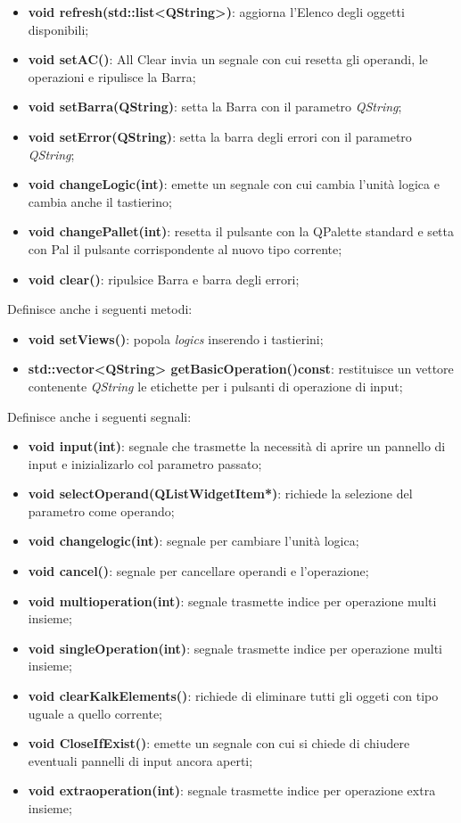 \documentclass[a4paper,10pt]{article}
\begin{document}
        \begin{itemize}
            \item \textbf{void refresh(std::list<QString>)}: aggiorna l'Elenco degli oggetti disponibili;
            \item \textbf{void setAC()}: All Clear invia un segnale con cui resetta gli operandi, le operazioni e ripulisce la Barra;
            \item \textbf{void setBarra(QString)}: setta la Barra con il parametro \textit{QString};
            \item \textbf{void setError(QString)}: setta la barra degli errori con il parametro \textit{QString};
            \item \textbf{void changeLogic(int)}: emette un segnale con cui cambia l'unità logica e cambia anche il tastierino;
            \item \textbf{void changePallet(int)}: resetta il pulsante con la QPalette standard e setta con Pal il pulsante corrispondente al nuovo tipo corrente;
            \item \textbf{void clear()}: ripulsice Barra e barra degli errori;
        \end{itemize}
        Definisce anche i seguenti metodi:
        \begin{itemize}
            \item \textbf{void setViews()}: popola \textit{logics} inserendo i tastierini;
            \item \textbf{std::vector<QString> getBasicOperation()const}: restituisce un vettore contenente \textit{QString} le etichette per i pulsanti di operazione di input;
        \end{itemize}
        Definisce anche i seguenti segnali:
        \begin{itemize}
            \item \textbf{void input(int)}: segnale che trasmette la necessità di aprire un pannello di input e inizializarlo col parametro passato;
            \item \textbf{void selectOperand(QListWidgetItem*)}: richiede la selezione del parametro come operando;
            \item \textbf{void changelogic(int)}: segnale per cambiare l'unità logica;
            \item \textbf{void cancel()}: segnale per cancellare operandi e l'operazione;
            \item \textbf{void multioperation(int)}: segnale trasmette indice per operazione multi insieme;
            \item \textbf{void singleOperation(int)}: segnale trasmette indice per operazione multi insieme;
            \item \textbf{void clearKalkElements()}: richiede di eliminare tutti gli oggeti con tipo uguale a quello corrente;
            \item \textbf{void CloseIfExist()}: emette un segnale con cui si chiede di chiudere eventuali pannelli di input ancora aperti;
            \item \textbf{void extraoperation(int)}: segnale trasmette indice per operazione extra insieme;
        \end{itemize}
\end{document}
